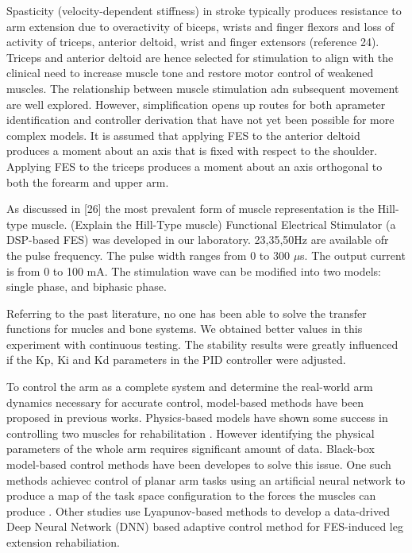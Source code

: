 Spasticity (velocity-dependent stiffness) in stroke typically produces resistance to arm extension due to overactivity of biceps, wrists and finger flexors and loss of activity of triceps, anterior deltoid, wrist and finger extensors (reference 24). \cite{IOL}
Triceps and anterior deltoid are hence selected for stimulation to align with the clinical need to increase muscle tone and restore motor control of weakened muscles. 
The relationship between muscle stimulation adn subsequent movement are well explored. However, simplification opens up routes for both aprameter identification and controller derivation that have not yet been possible for more complex models. \cite{IOL}
It is assumed that applying FES to the anterior deltoid produces a moment about an axis that is fixed with respect to the shoulder. Applying FES to the triceps produces a moment about an axis orthogonal to both the forearm and upper arm.\cite{IOL}

As discussed in [26] the most prevalent form of muscle representation is the Hill-type muscle. (Explain the Hill-Type muscle)
Functional Electrical Stimulator (a DSP-based FES) was developed in our laboratory. 23,35,50Hz are available ofr the pulse frequency. 
The pulse width ranges from 0 to 300 $\mu$s. The output current is from 0 to 100 mA. The stimulation wave can be modified into two models: single phase, and biphasic phase. \cite{NNPID}



Referring to the past literature, no one has been able to solve the transfer functions for mucles and bone systems. We obtained better values in this experiment with continuous testing. The stability results were greatly influenced if the Kp, Ki and Kd parameters in the PID controller were adjusted. \cite{NNPID}

To control the arm as a complete system and determine the real-world arm dynamics necessary for accurate control, model-based methods have been proposed in previous works. Physics-based models have shown some success in controlling two muscles for rehabilitation \cite{IOL}. However identifying the physical parameters of the whole arm requires significant amount of data. Black-box model-based control methods have been developes to solve this issue. One such methods achievec control of planar arm tasks using an artificial neural network to produce a map of the task space configuration to the forces the muscles can produce \cite{FC2D}. Other studies use Lyapunov-based methods to develop a data-drived Deep Neural Network (DNN) based adaptive control method for FES-induced leg extension rehabiliation. \cite{CLDNN}

